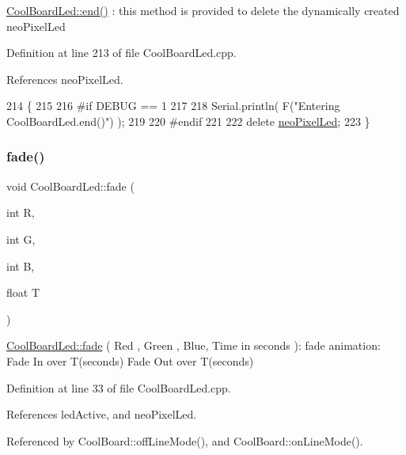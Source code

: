 \hyperlink{classCoolBoardLed_a69f323359e0c9f797422f2152b5d41ef}{Cool\+Board\+Led\+::end()} \+: this method is provided to delete the dynamically created neo\+Pixel\+Led 

Definition at line 213 of file Cool\+Board\+Led.\+cpp.



References neo\+Pixel\+Led.


\begin{DoxyCode}
214 \{
215 
216 \textcolor{preprocessor}{#if DEBUG == 1 }
217     
218     Serial.println( F(\textcolor{stringliteral}{"Entering CoolBoardLed.end()"}) );
219 
220 \textcolor{preprocessor}{#endif}
221 
222     \textcolor{keyword}{delete} \hyperlink{classCoolBoardLed_ac2c13fa462a010cd9242bf297c013923}{neoPixelLed};
223 \}
\end{DoxyCode}
\mbox{\label{classCoolBoardLed_af1cacbaa88db8bcf6042c1083ba41155}} 
\subsubsection{\texorpdfstring{fade()}{fade()}}
{\footnotesize\ttfamily void Cool\+Board\+Led\+::fade (\begin{DoxyParamCaption}\item[{int}]{R,  }\item[{int}]{G,  }\item[{int}]{B,  }\item[{float}]{T }\end{DoxyParamCaption})}

\hyperlink{classCoolBoardLed_af1cacbaa88db8bcf6042c1083ba41155}{Cool\+Board\+Led\+::fade} ( Red , Green , Blue, Time in seconds )\+: fade animation\+: Fade In over T(seconds) Fade Out over T(seconds) 

Definition at line 33 of file Cool\+Board\+Led.\+cpp.



References led\+Active, and neo\+Pixel\+Led.



Referenced by Cool\+Board\+::off\+Line\+Mode(), and Cool\+Board\+::on\+Line\+Mode().


